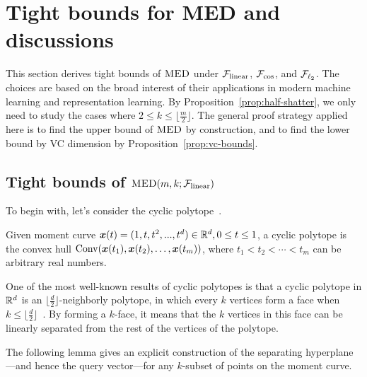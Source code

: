 \section{Tight bounds for MED and discussions}\label{sec:optimal-standard-theory}

This section derives tight bounds of $\textsc{MED}$ under $\mathcal{F}_{\rm linear}$, $\mathcal{F}_{\cos}$, and $\mathcal{F}_{\ell_{2}}$.
The choices are based on the broad interest of their applications in modern machine learning and representation learning. By Proposition~\ref{prop:half-shatter}, we only need to study the cases where $2\leq k \leq \lfloor \frac{m}{2} \rfloor$. The general proof strategy applied here is to find the upper bound of $\textsc{MED}$ by construction, and to find the lower bound by VC dimension by Proposition~\ref{prop:vc-bounds}.

\subsection{Tight bounds of $\textsc{MED}(m, k;\mathcal{F}_{\rm linear})$}\label{sec:linear-bounds}
To begin with, let's consider the cyclic polytope~\citep{ziegler2012lectures}.
\begin{example}\label{eg:cyclic-polytope}
	Given moment curve $\bm{x}(t) = (1, t, t^2, ..., t^d)\in \mathbb{R}^d, 0\leq t\leq 1$, a cyclic polytope is the convex hull ${\rm Conv}(\bm{x}(t_1), \bm{x}(t_2), \dots, \bm{x}(t_m))$, where $t_1 < t_2 < \cdots < t_m$ can be arbitrary real numbers.
\end{example}
One of the most well-known results of cyclic polytopes is that a cyclic polytope in $\mathbb{R}^d$ is an $\lfloor \frac{d}{2} \rfloor$-neighborly polytope, in which every $k$ vertices form a face when $k\leq \lfloor \frac{d}{2} \rfloor$~\citep{ziegler2012lectures}. By forming a $k$-face, it means that the $k$ vertices in this face can be linearly separated from the rest of the vertices of the polytope.

The following lemma gives an explicit construction of the separating hyperplane---and hence the query vector---for any $k$-subset of points on the moment curve.

